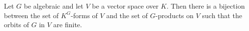 Let $G$ be algebraic and let $V$ be a vector space over $K$. Then there is a bijection between the set of $K^G$-forms of $V$ and the set of $G$-products on $V$ such that the orbits of $G$ in $V$ are finite.
